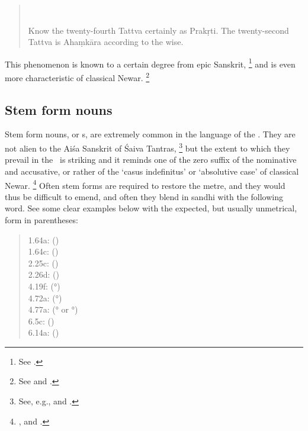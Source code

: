 \begin{quote}
\\

Know the twenty-fourth Tattva certainly as Prakṛti.
The twenty-second Tattva is Ahaṃkāra according to the wise.
\end{quote}

\noindent
This phenomenon is known to a certain degree
from epic Sanskrit,%
	\footnote{See .}
and is even more characteristic of classical Newar.%
		\footnote{See  and
									 .}





\subsection{Stem form nouns}

Stem form nouns, or s, are extremely common in the
language of the \VSS. They are not alien to the Aiśa Sanskrit
of Śaiva Tantras,%
		\footnote{See, e.g.,  and
								.}
but the extent to which they prevail in the \VSS\ is striking and it
reminds one of the zero suffix of the nominative and accusative,
or rather of the `casus indefinitus' or `absolutive case' of classical Newar.%
		\footnote{,
		 and .} 
Often stem forms are required to restore the metre, 
and they would thus be difficult to emend,
and often they blend in sandhi with the following word. 
See some clear examples below with the expected, 
but usually unmetrical, form in parentheses:

\begin{quote}
 1.64a:  () \\
1.64c:  () \\
2.25c:  () \\
2.26d:  () \\
4.19f:  (°) \\
4.72a:  (°) \\
4.77a:  (° or °)
 \\
6.5c:  () \\
6.14a:  () \\
\end{quote}





